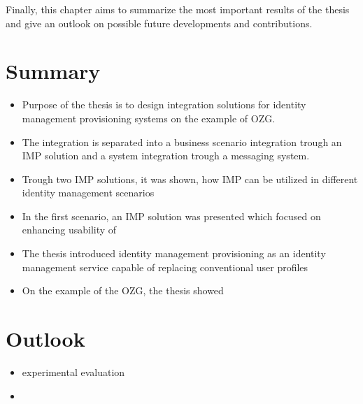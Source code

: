 Finally, this chapter aims to summarize the most important results of the thesis and give an outlook on possible future developments and contributions.

\section{Summary}

\begin{itemize}
    \item Purpose of the thesis is to design integration solutions for identity management provisioning systems on the example of OZG.
    \item The integration is separated into a business scenario integration trough an IMP solution and a system integration trough a messaging system.
    \item Trough two IMP solutions, it was shown, how IMP can be utilized in different identity management scenarios
    \item In the first scenario, an IMP solution was presented which focused on enhancing usability of 
    \item The thesis introduced identity management provisioning as an identity management service capable of replacing conventional user profiles
    \item On the example of the OZG, the thesis showed 
\end{itemize}

\section{Outlook}

\begin{itemize}
    \item experimental evaluation
    \item 
\end{itemize}